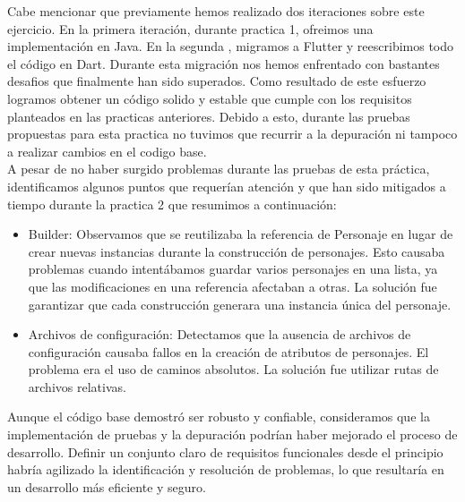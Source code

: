\documentclass{article}
\begin{document}
Cabe mencionar que previamente hemos realizado dos iteraciones sobre este ejercicio. En la primera iteración, durante practica 1, ofreimos una implementación en Java. En la segunda , migramos a Flutter y reescribimos todo el código en Dart. Durante esta migración nos hemos enfrentado con bastantes desafios que finalmente han sido superados. Como resultado de este esfuerzo logramos obtener un código solido y estable que cumple con los requisitos planteados en las practicas anteriores. Debido a esto, durante las pruebas propuestas para esta practica no tuvimos que recurrir a la depuración ni tampoco a realizar cambios en el codigo base. \\


A pesar de no haber surgido problemas durante las pruebas de esta práctica, identificamos algunos puntos que requerían atención y que han sido mitigados a tiempo durante la practica 2 que resumimos a continuación:

\begin{itemize}
\item Builder: Observamos que se reutilizaba la referencia de Personaje en lugar de crear nuevas instancias durante la construcción de personajes. Esto causaba problemas cuando intentábamos guardar varios personajes en una lista, ya que las modificaciones en una referencia afectaban a otras. La solución fue garantizar que cada construcción generara una instancia única del personaje.


\item Archivos de configuración: Detectamos que la ausencia de archivos de configuración causaba fallos en la creación de atributos de personajes. El problema era el uso de caminos absolutos. La solución fue utilizar rutas de archivos relativas. 

\end{itemize}


Aunque el código base demostró ser robusto y confiable, consideramos que la implementación de pruebas y la depuración podrían haber mejorado el proceso de desarrollo. Definir un conjunto claro de requisitos funcionales desde el principio habría agilizado la identificación y resolución de problemas, lo que resultaría en un desarrollo más eficiente y seguro. 
\end{document}
